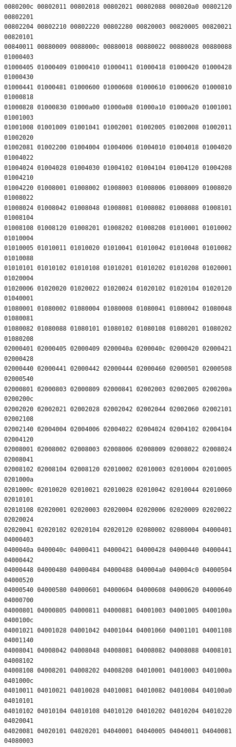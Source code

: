 \begin{Verbatim}[fontsize=\scriptsize]
0080200c 00802011 00802018 00802021 00802088 008020a0 00802120 00802201
00802204 00802210 00802220 00802280 00820003 00820005 00820021 00820101
00840011 00880009 0088000c 00880018 00880022 00880028 00880088 01000403
01000405 01000409 01000410 01000411 01000418 01000420 01000428 01000430
01000441 01000481 01000600 01000608 01000610 01000620 01000810 01000818
01000828 01000830 01000a00 01000a08 01000a10 01000a20 01001001 01001003
01001008 01001009 01001041 01002001 01002005 01002008 01002011 01002020
01002081 01002200 01004004 01004006 01004010 01004018 01004020 01004022
01004024 01004028 01004030 01004102 01004104 01004120 01004208 01004210
01004220 01008001 01008002 01008003 01008006 01008009 01008020 01008022
01008024 01008042 01008048 01008081 01008082 01008088 01008101 01008104
01008108 01008120 01008201 01008202 01008208 01010001 01010002 01010004
01010005 01010011 01010020 01010041 01010042 01010048 01010082 01010088
01010101 01010102 01010108 01010201 01010202 01010208 01020001 01020004
01020006 01020020 01020022 01020024 01020102 01020104 01020120 01040001
01080001 01080002 01080004 01080008 01080041 01080042 01080048 01080081
01080082 01080088 01080101 01080102 01080108 01080201 01080202 01080208
02000401 02000405 02000409 0200040a 0200040c 02000420 02000421 02000428
02000440 02000441 02000442 02000444 02000460 02000501 02000508 02000540
02000801 02000803 02000809 02000841 02002003 02002005 0200200a 0200200c
02002020 02002021 02002028 02002042 02002044 02002060 02002101 02002108
02002140 02004004 02004006 02004022 02004024 02004102 02004104 02004120
02008001 02008002 02008003 02008006 02008009 02008022 02008024 02008041
02008102 02008104 02008120 02010002 02010003 02010004 02010005 0201000a
0201000c 02010020 02010021 02010028 02010042 02010044 02010060 02010101
02010108 02020001 02020003 02020004 02020006 02020009 02020022 02020024
02020041 02020102 02020104 02020120 02080002 02080004 04000401 04000403
0400040a 0400040c 04000411 04000421 04000428 04000440 04000441 04000442
04000448 04000480 04000484 04000488 040004a0 040004c0 04000504 04000520
04000540 04000580 04000601 04000604 04000608 04000620 04000640 04000700
04000801 04000805 04000811 04000881 04001003 04001005 0400100a 0400100c
04001021 04001028 04001042 04001044 04001060 04001101 04001108 04001140
04008041 04008042 04008048 04008081 04008082 04008088 04008101 04008102
04008108 04008201 04008202 04008208 04010001 04010003 0401000a 0401000c
04010011 04010021 04010028 04010081 04010082 04010084 040100a0 04010101
04010102 04010104 04010108 04010120 04010202 04010204 04010220 04020041
04020081 04020101 04020201 04040001 04040005 04040011 04040081 04080003

\end{Verbatim}
